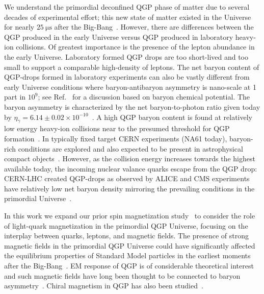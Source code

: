 \documentclass[epjST]{svjour}
\begin{document}
We understand the primordial deconfined QGP phase of matter due to several decades of experimental effort; this new state of matter existed in the Universe for nearly \(25~\mathrm{\mu s}\) after the Big-Bang~\cite{Rafelski:2019twp,Rafelski:2023emw,Rafelski:2024fej}. However, there are differences between the QGP produced in the early Universe versus QGP produced in laboratory heavy-ion collisions. Of greatest importance is the presence of the lepton abundance in the early Universe. Laboratory formed QGP drops are too short-lived and too small to support a comparable high-density of leptons. The net baryon content of QGP-drops formed in laboratory experiments can also be vastly different from early Universe conditions where baryon-antibaryon asymmetry is nano-scale {\color{blue}at 1 part in \(10^9\); see Ref.~\cite{Fromerth:2012fe} for a discussion based on baryon chemical potential. The baryon asymmetry is characterized by the net baryon-to-photon ratio given today by \(\eta_{\gamma}=6.14\pm0.02\times10^{-10}\)~\cite{ParticleDataGroup:2022pth}.} A high QGP baryon content is found at relatively low energy heavy-ion collisions near to the presumed threshold for QGP formation~\cite{Letessier:2005qe}. In typically fixed target CERN experiments (NA61 today), baryon-rich conditions are explored and also expected to be present in astrophysical compact objects~\cite{Ghosh:2025sjn}. However, as the collision energy increases towards the highest available today, the incoming nuclear valance quarks escape from the QGP drop: CERN-LHC created QGP-drops as observed by ALICE and CMS experiments have relatively low net baryon density mirroring the prevailing conditions in the primordial Universe~\cite{Letessier:2005qe}. 

In this work we expand our prior spin magnetization study~\cite{Steinmetz:2023nsc,Steinmetz:2023ucp} to consider the role of light-quark magnetization in the primordial QGP Universe, focusing on the interplay between quarks, leptons, and magnetic fields. The presence of strong magnetic fields in the primordial QGP Universe could have significantly affected the equilibrium properties of Standard Model particles in the earliest moments after the Big-Bang~\cite{Durrer:2013pga,Subramanian:2015lua}. EM response of QGP is of considerable theoretical interest~\cite{Grayson:2022asf,Shovkovy:2022bnd,Ghosh:2024fkg} and such magnetic fields have long been thought to be connected to baryon asymmetry~\cite{Vachaspati:1991nm,Baym:1995fk}. Chiral magnetism in QGP has also been studied~\cite{Fukushima:2008xe,Boyarsky:2011uy,Bali:2011qj}.
\end{document}
